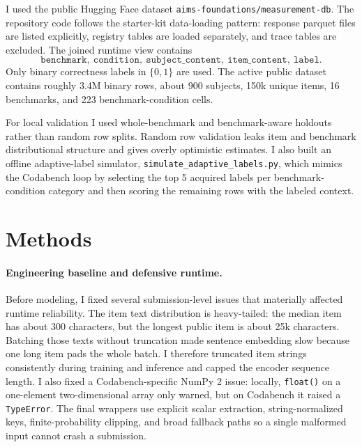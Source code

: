 \documentclass{article}
\begin{document}
I used the public Hugging Face dataset \texttt{aims-foundations/measurement-db}. The repository code follows the starter-kit data-loading pattern: response parquet files are listed explicitly, registry tables are loaded separately, and trace tables are excluded. The joined runtime view contains
\[
\texttt{benchmark},\ \texttt{condition},\ \texttt{subject\_content},\ \texttt{item\_content},\ \texttt{label}.
\]
Only binary correctness labels in $\{0,1\}$ are used. The active public dataset contains roughly 3.4M binary rows, about 900 subjects, 150k unique items, 16 benchmarks, and 223 benchmark-condition cells.

For local validation I used whole-benchmark and benchmark-aware holdouts rather than random row splits. Random row validation leaks item and benchmark distributional structure and gives overly optimistic estimates. I also built an offline adaptive-label simulator, \texttt{simulate\_adaptive\_labels.py}, which mimics the Codabench loop by selecting the top 5 acquired labels per benchmark-condition category and then scoring the remaining rows with the labeled context.

\section{Methods}

\paragraph{Engineering baseline and defensive runtime.}
Before modeling, I fixed several submission-level issues that materially affected runtime reliability. The item text distribution is heavy-tailed: the median item has about 300 characters, but the longest public item is about 25k characters. Batching those texts without truncation made sentence embedding slow because one long item pads the whole batch. I therefore truncated item strings consistently during training and inference and capped the encoder sequence length. I also fixed a Codabench-specific NumPy 2 issue: locally, \texttt{float()} on a one-element two-dimensional array only warned, but on Codabench it raised a \texttt{TypeError}. The final wrappers use explicit scalar extraction, string-normalized keys, finite-probability clipping, and broad fallback paths so a single malformed input cannot crash a submission.
\end{document}
